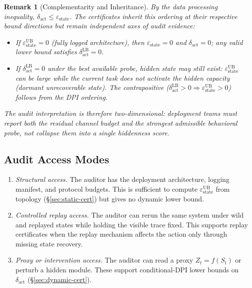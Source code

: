 \documentclass{article}
\newtheorem{remark}{Remark}
\begin{document}
  \begin{remark}[Complementarity and Inheritance]
  \label{rem:complementarity}
  By the data processing inequality, $\delta_\text{act} \leq
  \varepsilon_\text{state}$. The certificates inherit this ordering at their
  respective bound directions but remain independent axes of audit evidence:
  \begin{itemize}
    \item If $\varepsilon_\text{state}^\text{UB} = 0$ (fully logged
  architecture), then $\varepsilon_\text{state} = 0$ and $\delta_\text{act} =
  0$; any valid lower bound satisfies $\delta_\text{act}^\text{LB} = 0$.
    \item If $\delta_\text{act}^\text{LB} = 0$ under the best available probe,
  hidden state may still exist: $\varepsilon_\text{state}^\text{UB}$ can be
  large while the current task does not activate the hidden capacity (dormant
  unrecoverable state). The contrapositive ($\delta_\text{act}^\text{LB} > 0
  \Rightarrow \varepsilon_\text{state}^\text{UB} > 0$) follows from the DPI
  ordering.
  \end{itemize}
  The audit interpretation is therefore two-dimensional: deployment teams must
  report both the residual channel budget and the strongest admissible
  behavioral probe, not collapse them into a single hiddenness score.
  \end{remark}

  \subsection{Audit Access Modes}

  \begin{enumerate}
    \item \emph{Structural access.} The auditor has the deployment architecture,
   logging manifest, and protocol budgets. This is sufficient to compute
  $\varepsilon_\text{state}^\text{UB}$ from topology (\S\ref{sec:static-cert})
  but gives no dynamic lower bound.

    \item \emph{Controlled replay access.} The auditor can rerun the same system
   under wild and replayed states while holding the visible trace fixed. This
  supports replay certificates when the replay mechanism affects the action only
   through missing state recovery.

    \item \emph{Proxy or intervention access.} The auditor can read a proxy
  $Z_t=f(S_t)$ or perturb a hidden module. These support conditional-DPI lower
  bounds on $\delta_\text{act}$ (\S\ref{sec:dynamic-cert}).
  \end{enumerate}
\end{document}
